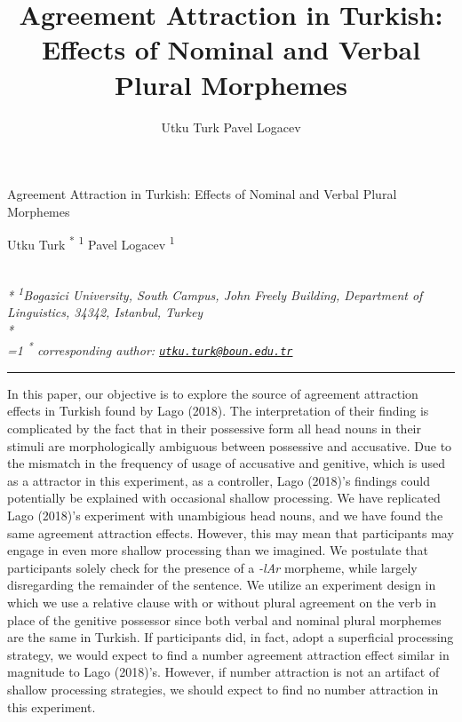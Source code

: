 \documentclass[11pt,a4paper]{article}
\title{Agreement Attraction in Turkish: Effects of Nominal and Verbal Plural
Morphemes}
\author{
Utku Turk
Pavel Logacev
}
\date{}
\begin{document}
\begin{singlespace}
\begin{center}
\huge Agreement Attraction in Turkish: Effects of Nominal and Verbal Plural
Morphemes
\end{center}
\begin{center}
\large
Utku Turk \textsuperscript{*} \textsuperscript{1} 
Pavel Logacev \textsuperscript{1} 
\end{center}
\begin{justify}
\footnotesize \emph{ 
\\*
\textsuperscript{1}Bogazici University, South Campus, John Freely Building, Department of
Linguistics, 34342, Istanbul, Turkey\\*
}
\setcounter{num}{1}
\\[0.1cm]
\footnotesize \emph{ 
\ifnum\value{num}=1%
\textsuperscript{*} corresponding author:
\fi
\href{mailto:utku.turk@boun.edu.tr}{\nolinkurl{utku.turk@boun.edu.tr}}
}
\end{justify}
\normalsize

\end{singlespace}


\vspace{2mm}\hrule

In this paper, our objective is to explore the source of agreement
attraction effects in Turkish found by Lago (2018). The interpretation
of their finding is complicated by the fact that in their possessive
form all head nouns in their stimuli are morphologically ambiguous
between possessive and accusative. Due to the mismatch in the frequency
of usage of accusative and genitive, which is used as a attractor in
this experiment, as a controller, Lago (2018)'s findings could
potentially be explained with occasional shallow processing. We have
replicated Lago (2018)'s experiment with unambigious head nouns, and we
have found the same agreement attraction effects. However, this may mean
that participants may engage in even more shallow processing than we
imagined. We postulate that participants solely check for the presence
of a \emph{-lAr} morpheme, while largely disregarding the remainder of
the sentence. We utilize an experiment design in which we use a relative
clause with or without plural agreement on the verb in place of the
genitive possessor since both verbal and nominal plural morphemes are
the same in Turkish. If participants did, in fact, adopt a superficial
processing strategy, we would expect to find a number agreement
attraction effect similar in magnitude to Lago (2018)'s. However, if
number attraction is not an artifact of shallow processing strategies,
we should expect to find no number attraction in this experiment.
\end{document}
